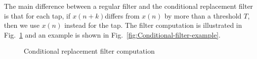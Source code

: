 \documentclass[smallabstract,smallcaptions]{dccpaper}
\begin{document}
The main difference between a regular filter and the conditional replacement
filter is that for each tap, if $x\left(n+k\right)$differs from $x\left(n\right)$
by more than a threshold $T$, then we use $x\left(n\right)$ instead
for the tap. The filter computation is illustrated in Fig.~\ref{fig:Conditional-filter-computation}
and an example is shown in Fig.~\ref{fig:Conditional-filter-example}.

\begin{figure}

\caption{Conditional replacement filter computation\label{fig:Conditional-filter-computation}}


\end{figure}
\end{document}

